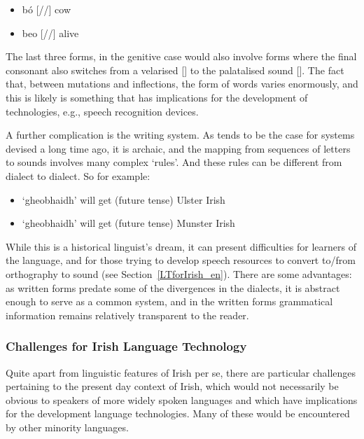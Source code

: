 \begin{multicols}{2}
\begin{itemize}
\item bó [//] cow  
\item beo [//] alive  
\end{itemize}

The last three forms, in the genitive case would also involve forms where the final consonant also switches from a velarised [] to the palatalised sound []. The fact that, between mutations and inflections, the form of words varies enormously, and this is likely is something that has implications for the development of technologies, e.g., speech recognition devices.

A further complication is the writing system. As tends to be the case for systems devised a long time ago, it is archaic, and the mapping from sequences of letters to sounds involves many complex ‘rules’. And these rules can be different from dialect to dialect. So for example:

\begin{itemize}
\item [ \textipa{j\textsuperscript{j}o\textlengthmark i} ] `gheobhaidh’  will get (future tense) Ulster Irish
\item [ \textipa{g\textsuperscript{j}o\textlengthmark g\textsuperscript{j}} ] `gheobhaidh’  will get (future tense) Munster Irish
\end{itemize}

While this is a historical linguist's dream, it can present difficulties for learners of the language, and for those trying to develop speech resources to convert to/from orthography to sound (see Section~\ref{LTforIrish_en}).  There are some advantages: as written forms predate some of the divergences in the dialects, it is abstract enough to serve as a common system, and in the written forms grammatical information remains relatively transparent to the reader.

\subsubsection {Challenges for Irish Language Technology}

Quite apart from linguistic features of Irish per se, there are particular challenges pertaining to the present day context of Irish, which would not necessarily be obvious to speakers of more widely spoken languages and which have implications for the development language technologies. Many of these would be encountered by other minority languages.


\end{multicols}
